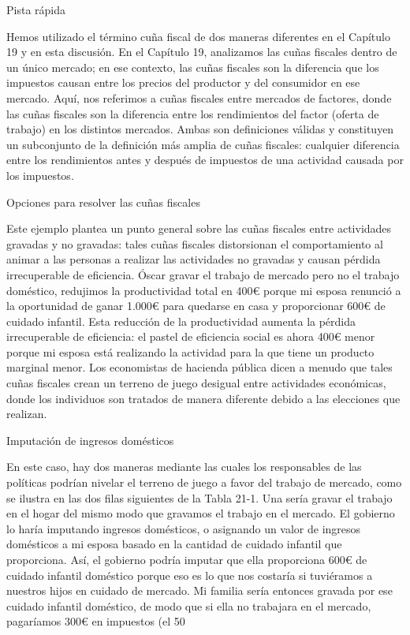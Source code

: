 \documentclass[10pt,a4paper]{article}
\begin{document}
Pista rápida

Hemos utilizado el término cuña fiscal de dos maneras diferentes en el Capítulo 19 y en esta discusión. En el Capítulo 19, analizamos las cuñas fiscales dentro de un único mercado; en ese contexto, las cuñas fiscales son la diferencia que los impuestos causan entre los precios del productor y del consumidor en ese mercado. Aquí, nos referimos a cuñas fiscales entre mercados de factores, donde las cuñas fiscales son la diferencia entre los rendimientos del factor (oferta de trabajo) en los distintos mercados. Ambas son definiciones válidas y constituyen un subconjunto de la definición más amplia de cuñas fiscales: cualquier diferencia entre los rendimientos antes y después de impuestos de una actividad causada por los impuestos.

Opciones para resolver las cuñas fiscales

Este ejemplo plantea un punto general sobre las cuñas fiscales entre actividades gravadas y no gravadas: tales cuñas fiscales distorsionan el comportamiento al animar a las personas a realizar las actividades no gravadas y causan pérdida irrecuperable de eficiencia. Óscar gravar el trabajo de mercado pero no el trabajo doméstico, redujimos la productividad total en 400€ porque mi esposa renunció a la oportunidad de ganar 1.000€ para quedarse en casa y proporcionar 600€ de cuidado infantil. Esta reducción de la productividad aumenta la pérdida irrecuperable de eficiencia: el pastel de eficiencia social es ahora 400€ menor porque mi esposa está realizando la actividad para la que tiene un producto marginal menor. Los economistas de hacienda pública dicen a menudo que tales cuñas fiscales crean un terreno de juego desigual entre actividades económicas, donde los individuos son tratados de manera diferente debido a las elecciones que realizan.

Imputación de ingresos domésticos

En este caso, hay dos maneras mediante las cuales los responsables de las políticas podrían nivelar el terreno de juego a favor del trabajo de mercado, como se ilustra en las dos filas siguientes de la Tabla 21-1. Una sería gravar el trabajo en el hogar del mismo modo que gravamos el trabajo en el mercado. El gobierno lo haría imputando ingresos domésticos, o asignando un valor de ingresos domésticos a mi esposa basado en la cantidad de cuidado infantil que proporciona. Así, el gobierno podría imputar que ella proporciona 600€ de cuidado infantil doméstico porque eso es lo que nos costaría si tuviéramos a nuestros hijos en cuidado de mercado. Mi familia sería entonces gravada por ese cuidado infantil doméstico, de modo que si ella no trabajara en el mercado, pagaríamos 300€ en impuestos (el 50 %
\end{document}
